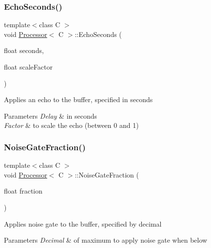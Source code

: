\subsubsection{\texorpdfstring{Echo\+Seconds()}{EchoSeconds()}}
{\footnotesize\ttfamily template$<$class C $>$ \\
void \hyperlink{classProcessor}{Processor}$<$ C $>$\+::Echo\+Seconds (\begin{DoxyParamCaption}\item[{float}]{seconds,  }\item[{float}]{scale\+Factor }\end{DoxyParamCaption})\hspace{0.3cm}{\ttfamily [inline]}}

Applies an echo to the buffer, specified in seconds


\begin{DoxyParams}{Parameters}
{\em Delay} & in seconds \\
\hline
{\em Factor} & to scale the echo (between 0 and 1) \\
\hline
\end{DoxyParams}
\mbox{\label{classProcessor_a8762bfcd807bfd8242e8398e0541508c}} 
\subsubsection{\texorpdfstring{Noise\+Gate\+Fraction()}{NoiseGateFraction()}}
{\footnotesize\ttfamily template$<$class C $>$ \\
void \hyperlink{classProcessor}{Processor}$<$ C $>$\+::Noise\+Gate\+Fraction (\begin{DoxyParamCaption}\item[{float}]{fraction }\end{DoxyParamCaption})\hspace{0.3cm}{\ttfamily [inline]}}

Applies noise gate to the buffer, specified by decimal


\begin{DoxyParams}{Parameters}
{\em Decimal} & of maximum to apply noise gate when below \\
\hline
\end{DoxyParams}
\mbox{\label{classProcessor_a21406185912e85d6d43657257c4095c0}} 

